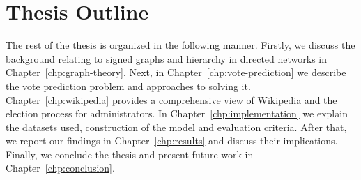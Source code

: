 \section{Thesis Outline}
The rest of the thesis is organized in the following manner. Firstly, we discuss the background relating to signed graphs and hierarchy in directed networks in Chapter~\ref{chp:graph-theory}. Next, in Chapter~\ref{chp:vote-prediction} we describe the vote prediction problem and approaches to solving it. Chapter~\ref{chp:wikipedia} provides a comprehensive view of Wikipedia and the election process for administrators. In Chapter~\ref{chp:implementation} we explain the datasets used, construction of the model and evaluation criteria. After that, we report our findings in Chapter~\ref{chp:results} and discuss their implications. Finally, we conclude the thesis and present future work in Chapter~\ref{chp:conclusion}.